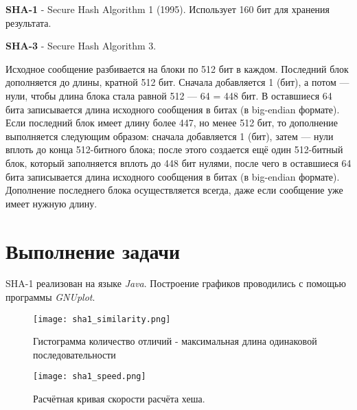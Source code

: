 \documentclass[12pt, a4paper]{report}
\begin{document}
	\textbf{SHA-1} - Secure Hash Algorithm 1 (1995). Использует 160 бит для хранения результата. \par
	\textbf{SHA-3} - Secure Hash Algorithm 3. \par
	Исходное сообщение разбивается на блоки по 512 бит в каждом. Последний блок дополняется до длины, кратной 512 бит. Сначала добавляется 1 (бит), а потом — нули, чтобы длина блока стала равной 512 — 64 = 448 бит. В оставшиеся 64 бита записывается длина исходного сообщения в битах (в big-endian формате). Если последний блок имеет длину более 447, но менее 512 бит, то дополнение выполняется следующим образом: сначала добавляется 1 (бит), затем — нули вплоть до конца 512-битного блока; после этого создается ещё один 512-битный блок, который заполняется вплоть до 448 бит нулями, после чего в оставшиеся 64 бита записывается длина исходного сообщения в битах (в big-endian формате). Дополнение последнего блока осуществляется всегда, даже если сообщение уже имеет нужную длину.

	\newpage

	\section*{Выполнение задачи}
	SHA-1 реализован на языке \textit{Java}. Построение графиков проводились с помощью программы \textit{GNUplot}.

	\newpage
	\vfill

	\begin{figure}[h]
		\centering
		\texttt{[image: sha1\_similarity.png]}
		\caption{Гистограмма количество отличий - максимальная длина одинаковой последовательности}
	\end{figure}

	\begin{figure}[h]
		\centering
		\texttt{[image: sha1\_speed.png]}
		\caption{Расчётная кривая скорости расчёта хеша.}
	\end{figure}
\end{document}
